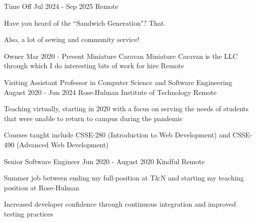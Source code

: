 

\begin{cventries}

  \cventry
  {Time Off}
  {Jul 2024 - Sep 2025}
  {}
  {Remote}
  {
    \begin{cvitems}
      \item Have you heard of the ``Sandwich Generation"? That.
      \item Also, a lot of sewing and community service!
    \end{cvitems}
    \cvtags{
      \tagAirtable
      \tagProjectManagement
      \tagTeaching
    }
  }

  \cventrywithorganizationnote
  {Owner}
  {Mar 2020 - Present}
  {Miniature Caravan}
  {Miniature Caravan is the LLC through which I do interesting bits of work for hire}
  {Remote}
  {
    \cvtags{
      \tagRuby
      \tagRails
      \tagHAML
      \tagSASS
      \tagAirtable
      \tagPostgreSQL
      \tagTDD
      \tagProjectManagement
    }
  }

  \cventry
  {Visiting Assistant Professor in Computer Science and Software Engineering}
  {August 2020 - Jun 2024}
  {Rose-Hulman Institute of Technology}
  {Remote}
  {
    \begin{cvitems}
      \item Teaching virtually, starting in 2020 with a focus on serving the needs of students that were unable to return to campus during the pandemic
      \item Courses taught include CSSE-280 (Introduction to Web Development) and CSSE-490 (Advanced Web Development)
    \end{cvitems}
    \cvtags{
      \tagCSS
      \tagHTML
      \tagJavaScript
      \tagPython
      \tagSASS
      \tagFlask
      \tagReact
      \tagAirtable
      \tagSQLite
      \tagFigma
      \tagTeaching
      \tagTDD
    }
  }

  \cventry
  {Senior Software Engineer}
  {Jun 2020 - August 2020}
  {Kindful}
  {Remote}
  {
    \begin{cvitems}
      \item Summer job between ending my full-position at T\&N and starting my teaching position at Rose-Hulman
      \item Increased developer confidence through continuous integration and improved testing practices
    \end{cvitems}
    \cvtags{
      \tagRuby
      \tagRails
      \tagPostgreSQL
      \tagCI
      \tagTDD
    }
  }


\end{cventries}
